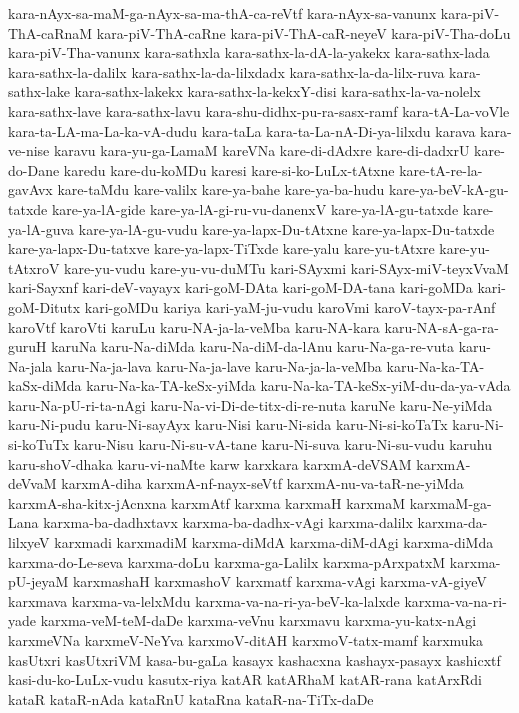 {kara-nAyx-sa-maM-ga-nAyx-sa-ma-thA-ca-reVtf
kara-nAyx-sa-vanunx
kara-piV-ThA-caRnaM
kara-piV-ThA-caRne
kara-piV-ThA-caR-neyeV
kara-piV-Tha-doLu
kara-piV-Tha-vanunx
kara-sathxla
kara-sathx-la-dA-la-yakekx
kara-sathx-lada
kara-sathx-la-dalilx
kara-sathx-la-da-lilxdadx
kara-sathx-la-da-lilx-ruva
kara-sathx-lake
kara-sathx-lakekx
kara-sathx-la-kekxY-disi
kara-sathx-la-va-nolelx
kara-sathx-lave
kara-sathx-lavu
kara-shu-didhx-pu-ra-sasx-ramf
kara-tA-La-voVle
kara-ta-LA-ma-La-ka-vA-dudu
kara-taLa
kara-ta-La-nA-Di-ya-lilxdu
karava
kara-ve-nise
karavu
kara-yu-ga-LamaM
kareVNa
kare-di-dAdxre
kare-di-dadxrU
kare-do-Dane
karedu
kare-du-koMDu
karesi
kare-si-ko-LuLx-tAtxne
kare-tA-re-la-gavAvx
kare-taMdu
kare-valilx
kare-ya-bahe
kare-ya-ba-hudu
kare-ya-beV-kA-gu-tatxde
kare-ya-lA-gide
kare-ya-lA-gi-ru-vu-danenxV
kare-ya-lA-gu-tatxde
kare-ya-lA-guva
kare-ya-lA-gu-vudu
kare-ya-lapx-Du-tAtxne
kare-ya-lapx-Du-tatxde
kare-ya-lapx-Du-tatxve
kare-ya-lapx-TiTxde
kare-yalu
kare-yu-tAtxre
kare-yu-tAtxroV
kare-yu-vudu
kare-yu-vu-duMTu
kari-SAyxmi
kari-SAyx-miV-teyxVvaM
kari-Sayxnf
kari-deV-vayayx
kari-goM-DAta
kari-goM-DA-tana
kari-goMDa
kari-goM-Ditutx
kari-goMDu
kariya
kari-yaM-ju-vudu
karoVmi
karoV-tayx-pa-rAnf
karoVtf
karoVti
karuLu
karu-NA-ja-la-veMba
karu-NA-kara
karu-NA-sA-ga-ra-guruH
karuNa
karu-Na-diMda
karu-Na-diM-da-lAnu
karu-Na-ga-re-vuta
karu-Na-jala
karu-Na-ja-lava
karu-Na-ja-lave
karu-Na-ja-la-veMba
karu-Na-ka-TA-kaSx-diMda
karu-Na-ka-TA-keSx-yiMda
karu-Na-ka-TA-keSx-yiM-du-da-ya-vAda
karu-Na-pU-ri-ta-nAgi
karu-Na-vi-Di-de-titx-di-re-nuta
karuNe
karu-Ne-yiMda
karu-Ni-pudu
karu-Ni-sayAyx
karu-Nisi
karu-Ni-sida
karu-Ni-si-koTaTx
karu-Ni-si-koTuTx
karu-Nisu
karu-Ni-su-vA-tane
karu-Ni-suva
karu-Ni-su-vudu
karuhu
karu-shoV-dhaka
karu-vi-naMte
karw
karxkara
karxmA-deVSAM
karxmA-deVvaM
karxmA-diha
karxmA-nf-nayx-seVtf
karxmA-nu-va-taR-ne-yiMda
karxmA-sha-kitx-jAcnxna
karxmAtf
karxma
karxmaH
karxmaM
karxmaM-ga-Lana
karxma-ba-dadhxtavx
karxma-ba-dadhx-vAgi
karxma-dalilx
karxma-da-lilxyeV
karxmadi
karxmadiM
karxma-diMdA
karxma-diM-dAgi
karxma-diMda
karxma-do-Le-seva
karxma-doLu
karxma-ga-Lalilx
karxma-pArxpatxM
karxma-pU-jeyaM
karxmashaH
karxmashoV
karxmatf
karxma-vAgi
karxma-vA-giyeV
karxmava
karxma-va-lelxMdu
karxma-va-na-ri-ya-beV-ka-lalxde
karxma-va-na-ri-yade
karxma-veM-teM-daDe
karxma-veVnu
karxmavu
karxma-yu-katx-nAgi
karxmeVNa
karxmeV-NeYva
karxmoV-ditAH
karxmoV-tatx-mamf
karxmuka
kasUtxri
kasUtxriVM
kasa-bu-gaLa
kasayx
kashacxna
kashayx-pasayx
kashicxtf
kasi-du-ko-LuLx-vudu
kasutx-riya
katAR
katARhaM
katAR-rana
katArxRdi
kataR
kataR-nAda
kataRnU
kataRna
kataR-na-TiTx-daDe
}

